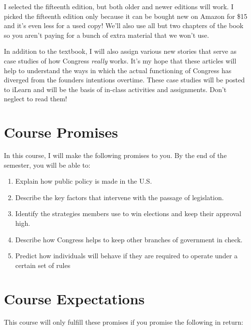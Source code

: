 \documentclass[11pt]{article}
\begin{document}
I selected the fifteenth edition, but both older and newer editions will work. I picked the fifteenth edition only because it can be bought new on Amazon for \$15 and it's even less for a used copy! We'll also use all but two chapters of the book so you aren't paying for a bunch of extra material that we won't use. 

In addition to the textbook, I will also assign various new stories that serve as case studies of how Congress \textit{really} works. It's my hope that these articles will help to understand the ways in which the actual functioning of Congress has diverged from the founders intentions overtime. These case studies will be posted to iLearn and will be the basis of in-class activities and assignments. Don't neglect to read them!


\section*{Course Promises}

In this course, I will make the following promises to you. By the end of the semester, you will be able to:

\begin{enumerate}
	\item Explain how public policy is made in the U.S. 
	\item Describe the key factors that intervene with the passage of legislation.
	\item Identify the strategies members use to win elections and keep their approval high.
	\item Describe how Congress helps to keep other branches of government in check.
	\item Predict how individuals will behave if they are required to operate under a certain set of rules
\end{enumerate}


\section*{Course Expectations}

This course will only fulfill these promises if you promise the following in return:
\end{document}
